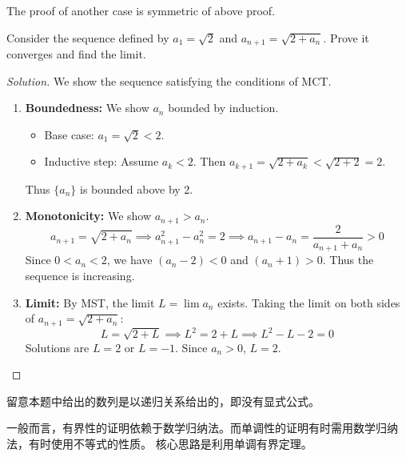\documentclass[
	UTF-8,
	11pt, %
	a4paper, %
]{LegrandOrangeBook}
\begin{document}
        The proof of another case is symmetric of above proof.

        \newpage

        \begin{example}
        Consider the sequence defined by $a_1 = \sqrt{2}$ and $a_{n+1} = \sqrt{2 + a_n}$. Prove it converges and find the limit.

        \begin{proof}[Solution] We show the sequence satisfying the conditions of MCT.
            \begin{enumerate}
            \item \textbf{Boundedness:} We show $a_n$ bounded by induction.
            \begin{itemize}[itemsep=0.5em, topsep=0.5em]
                \item Base case: $a_1 = \sqrt{2} < 2$.
                \item Inductive step: Assume $a_k < 2$. Then $a_{k+1} = \sqrt{2+a_k} < \sqrt{2+2} = 2$.
            \end{itemize}
            Thus $\{a_n\}$ is bounded above by 2.

            \item \textbf{Monotonicity:} We show $a_{n+1} > a_n$.
            \[ a_{n+1} = \sqrt{2 + a_n} \implies a_{n+1}^2 - a_n^2 = 2 \implies a_{n+1} - a_n =\frac{2}{a_{n+1}+a_n} > 0 \]
            Since $0 < a_n < 2$, we have $(a_n - 2) < 0$ and $(a_n + 1) > 0$.
            Thus the sequence is increasing.

            \item \textbf{Limit:} By MST, the limit $L = \lim a_n$ exists.
            Taking the limit on both sides of $a_{n+1} = \sqrt{2 + a_n}$:
            \[ L = \sqrt{2 + L} \implies L^2 = 2 + L \implies L^2 - L - 2 = 0 \]
            Solutions are $L = 2$ or $L = -1$. Since $a_n > 0$, $L = 2$.
        \end{enumerate}
        \end{proof}
        \end{example}

        \begin{remark}
            留意本题中给出的数列是以递归关系给出的，即没有显式公式。
        \end{remark}

        \begin{remark}
            一般而言，有界性的证明依赖于数学归纳法。而单调性的证明有时需用数学归纳法，有时使用不等式的性质。
            核心思路是利用单调有界定理。
        \end{remark}
\end{document}
